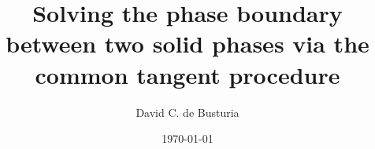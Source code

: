 \documentclass{beamer}
\title[Your Short Title]{Solving the phase boundary between two solid phases via the common tangent procedure}
\author{David C. de Busturia}
\institute{Department of Chemistry. Imperial College London}
\date{\today} %
\begin{document}
\def\folders{10.00K,
30.10K,
50.20K,
70.30K,
90.40K,
110.51K,
130.61K,
150.71K,
170.81K,
190.91K,
211.01K,
231.11K,
251.21K,
271.31K,
291.41K,
311.52K,
331.62K,
351.72K}



\newcommand{\Funkytable}[1]{
$T = {#1}$
}



\begin{frame}
  \titlepage
\end{frame}
\end{document}
